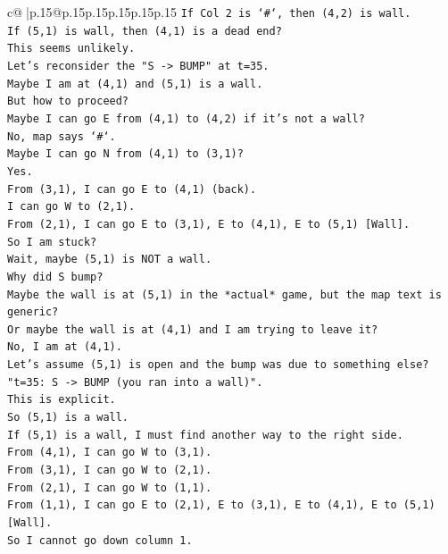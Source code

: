 \documentclass{article}
\begin{document}
{\begin{supertabular}{c@{$\;$}|p{.15\linewidth}@{}p{.15\linewidth}p{.15\linewidth}p{.15\linewidth}p{.15\linewidth}p{.15\linewidth}}
{{{\texttt{If Col 2 is `\#`, then (4,2) is wall.} \\
\texttt{If (5,1) is wall, then (4,1) is a dead end?} \\
\texttt{This seems unlikely.} \\
\texttt{Let's reconsider the "S {-}> BUMP" at t=35.} \\
\texttt{Maybe I am at (4,1) and (5,1) is a wall.} \\
\texttt{But how to proceed?} \\
\texttt{Maybe I can go E from (4,1) to (4,2) if it's not a wall?} \\
\texttt{No, map says `\#`.} \\
\texttt{Maybe I can go N from (4,1) to (3,1)?} \\
\texttt{Yes.} \\
\texttt{From (3,1), I can go E to (4,1) (back).} \\
\texttt{I can go W to (2,1).} \\
\texttt{From (2,1), I can go E to (3,1), E to (4,1), E to (5,1) {[}Wall{]}.} \\
\texttt{So I am stuck?} \\
\texttt{Wait, maybe (5,1) is NOT a wall.} \\
\texttt{Why did S bump?} \\
\texttt{Maybe the wall is at (5,1) in the *actual* game, but the map text is generic?} \\
\texttt{Or maybe the wall is at (4,1) and I am trying to leave it?} \\
\texttt{No, I am at (4,1).} \\
\texttt{Let's assume (5,1) is open and the bump was due to something else?} \\
\texttt{"t=35: S {-}> BUMP (you ran into a wall)".} \\
\texttt{This is explicit.} \\
\texttt{So (5,1) is a wall.} \\
\texttt{If (5,1) is a wall, I must find another way to the right side.} \\
\texttt{From (4,1), I can go W to (3,1).} \\
\texttt{From (3,1), I can go W to (2,1).} \\
\texttt{From (2,1), I can go W to (1,1).} \\
\texttt{From (1,1), I can go E to (2,1), E to (3,1), E to (4,1), E to (5,1) {[}Wall{]}.} \\
\texttt{So I cannot go down column 1.} \\
}}}
\end{supertabular}}
\end{document}
